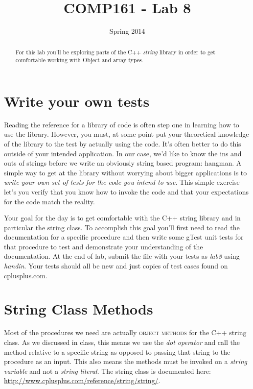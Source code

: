 \documentclass[]{tufte-handout}
\title{COMP161 - Lab 8}
\author{}
\date{Spring 2014}
\begin{document}
\maketitle

\begin{abstract}
For this lab you'll be exploring parts of the C++ \textit{string} library in order to get comfortable working with Object and array types.
\end{abstract}

\section{Write your own tests}

Reading the reference for a library of code is often step one in learning how to use the library.  However, you must, at some point put your theoretical knowledge of the library to the test by actually using the code.  It's often better to do this outside of your intended application.  In our case, we'd like to know the ins and outs of strings before we write an obviously string based program: hangman. A simple way to get at the library without worrying about bigger applications is to \textit{write your own set of tests for the code you intend to use}. This simple exercise let's you verify that you know how to invoke the code and that your expectations for the code match the reality.  

Your goal for the day is to get comfortable with the C++ string library and in particular the string class. To accomplish this goal you'll first need to read the documentation for a specific procedure and then write some gTest unit tests for that procedure to test and demonstrate your understanding of the documentation.  At the end of lab, submit the file with your tests as \textit{lab8} using \textit{handin}.  Your tests should all be new and just copies of test cases found on cplusplus.com.

\section{String Class Methods}

Most of the procedures we need are actually \textsc{object methods} for the C++ string class.  As we discussed in class, this means we use the \textit{dot operator} and call the method relative to a specific string as opposed to passing that string to the procedure as an input. This also means the methods must be invoked on a \textit{string variable} and not a \textit{string literal}. The string class is documented here: \url{http://www.cplusplus.com/reference/string/string/}.
\end{document}
